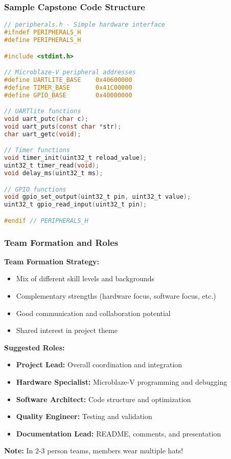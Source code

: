 \documentclass{beamer}
\begin{document}
\begin{frame}[fragile]
\frametitle{Sample Capstone Code Structure}
\begin{lstlisting}[language=C, basicstyle=\tiny]
// peripherals.h - Simple hardware interface
#ifndef PERIPHERALS_H
#define PERIPHERALS_H

#include <stdint.h>

// Microblaze-V peripheral addresses
#define UARTLITE_BASE    0x40600000
#define TIMER_BASE       0x41C00000
#define GPIO_BASE        0x40000000

// UARTlite functions
void uart_putc(char c);
void uart_puts(const char *str);
char uart_getc(void);

// Timer functions
void timer_init(uint32_t reload_value);
uint32_t timer_read(void);
void delay_ms(uint32_t ms);

// GPIO functions
void gpio_set_output(uint32_t pin, uint32_t value);
uint32_t gpio_read_input(uint32_t pin);

#endif // PERIPHERALS_H
\end{lstlisting}
\end{frame}

\begin{frame}
\frametitle{Team Formation and Roles}
\small \textbf{Team Formation Strategy:}
\begin{itemize}
    \item \footnotesize Mix of different skill levels and backgrounds
    \item \footnotesize Complementary strengths (hardware focus, software focus, etc.)
    \item \footnotesize Good communication and collaboration potential
    \item \footnotesize Shared interest in project theme
\end{itemize}

\vspace{0.3cm}
\small \textbf{Suggested Roles:}
\begin{itemize}
    \item \footnotesize \textbf{Project Lead:} Overall coordination and integration
    \item \footnotesize \textbf{Hardware Specialist:} Microblaze-V programming and debugging
    \item \footnotesize \textbf{Software Architect:} Code structure and optimization
    \item \footnotesize \textbf{Quality Engineer:} Testing and validation
    \item \footnotesize \textbf{Documentation Lead:} README, comments, and presentation
\end{itemize}

\vspace{0.3cm}
\textbf{Note:} In 2-3 person teams, members wear multiple hats!
\end{frame}
\end{document}
